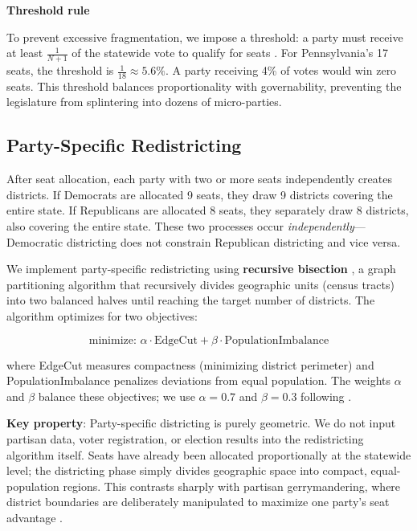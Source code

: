 \textbf{Threshold rule}

To prevent excessive fragmentation, we impose a threshold: a party must receive at least $\frac{1}{N+1}$ of the statewide vote to qualify for seats \citep{taagepera1989seats}. For Pennsylvania's 17 seats, the threshold is $\frac{1}{18} \approx 5.6\%$. A party receiving 4\% of votes would win zero seats. This threshold balances proportionality with governability, preventing the legislature from splintering into dozens of micro-parties.

\subsection{Party-Specific Redistricting}

After seat allocation, each party with two or more seats independently creates districts. If Democrats are allocated 9 seats, they draw 9 districts covering the entire state. If Republicans are allocated 8 seats, they separately draw 8 districts, also covering the entire state. These two processes occur \emph{independently}—Democratic districting does not constrain Republican districting and vice versa.

We implement party-specific redistricting using \textbf{recursive bisection} \citep{author2024recursive}, a graph partitioning algorithm that recursively divides geographic units (census tracts) into two balanced halves until reaching the target number of districts. The algorithm optimizes for two objectives:

\begin{equation}
\text{minimize: } \alpha \cdot \text{EdgeCut} + \beta \cdot \text{PopulationImbalance}
\end{equation}

where EdgeCut measures compactness (minimizing district perimeter) and PopulationImbalance penalizes deviations from equal population. The weights $\alpha$ and $\beta$ balance these objectives; we use $\alpha = 0.7$ and $\beta = 0.3$ following \citet{author2024recursive}.

\textbf{Key property}: Party-specific districting is purely geometric. We do not input partisan data, voter registration, or election results into the redistricting algorithm itself. Seats have already been allocated proportionally at the statewide level; the districting phase simply divides geographic space into compact, equal-population regions. This contrasts sharply with partisan gerrymandering, where district boundaries are deliberately manipulated to maximize one party's seat advantage \citep{mcghee2020partisan}.

